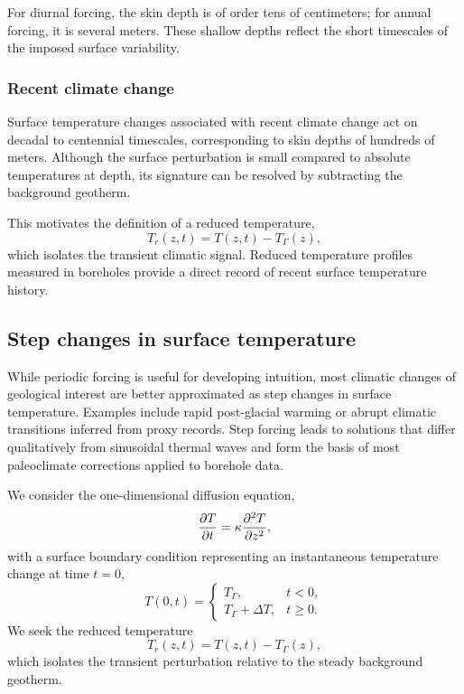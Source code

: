 For diurnal forcing, the skin depth is of order tens of centimeters; for annual forcing, it is several meters. These shallow depths reflect the short timescales of the imposed surface variability.

\subsubsection*{Recent climate change}

Surface temperature changes associated with recent climate change act on decadal to
centennial timescales, corresponding to skin depths of hundreds of meters. Although
the surface perturbation is small compared to absolute temperatures at depth, its
signature can be resolved by subtracting the background geotherm.

This motivates the definition of a reduced temperature,
\begin{equation}
T_r(z,t) = T(z,t) - T_\Gamma(z),
\end{equation}
which isolates the transient climatic signal. Reduced temperature profiles measured
in boreholes provide a direct record of recent surface temperature history.

\subsection{Step changes in surface temperature}

While periodic forcing is useful for developing intuition, most climatic changes of geological interest are better approximated as step changes in surface temperature.  Examples include rapid post-glacial warming or abrupt climatic transitions inferred from proxy records. Step forcing leads to solutions that differ qualitatively from sinusoidal thermal waves and form the basis of most paleoclimate corrections applied to borehole data.

We consider the one-dimensional diffusion equation,
\begin{equation}
    \pdv{T}{t} = \kappa \pdv[2]{T}{z},
\end{equation}
with a surface boundary condition representing an instantaneous temperature change at time $t=0$,
\begin{equation}
    T(0,t) =
    \begin{cases}
        T_\Gamma, & t < 0, \\
        T_\Gamma + \Delta T, & t \ge 0.
    \end{cases}
\end{equation}
We seek the reduced temperature
\begin{equation}
    T_r(z,t) = T(z,t) - T_\Gamma(z),
\end{equation}
which isolates the transient perturbation relative to the steady background geotherm.

